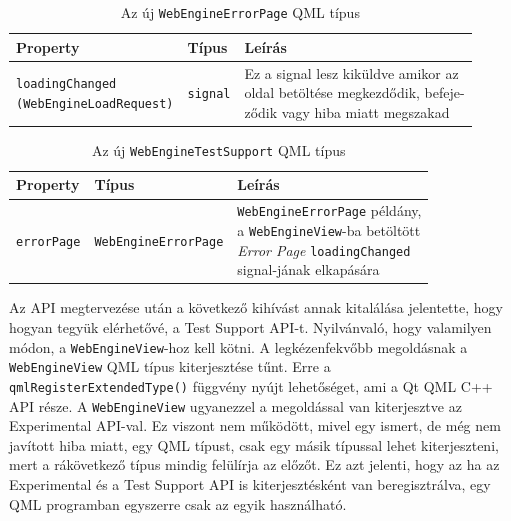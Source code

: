 \documentclass[12pt]{report}
\begin{document}
\begin{table}[h!]
    \centering
    \begin{tabular}{ | l | l | p{185pt} | }
        \hline
        \textbf{Property} & \textbf{Típus} & \textbf{Leírás} \\ \hline

        \makecell[l]{\texttt{loadingChanged} \\ \texttt{(WebEngineLoadRequest)}} &
        \texttt{signal} &
        \makecell[l]{
        Ez a signal lesz kiküldve amikor az \\
        oldal betöltése megkezdődik, befeje-\\
        ződik vagy hiba miatt megszakad}
        \\ \hline
    \end{tabular}
    \caption{
        \label{tab:test-support-webengine-errorpage}
        Az új \texttt{WebEngineErrorPage} QML típus
    }
\end{table}

\begin{table}[ht]
    \centering
    \begin{tabular}{ | l | l | p{195pt} | }
        \hline
        \textbf{Property} & \textbf{Típus} & \textbf{Leírás} \\ \hline

        \texttt{errorPage} & \texttt{WebEngineErrorPage} &
        \makecell[l]{
            \texttt{WebEngineErrorPage} példány, \\
            a \texttt{WebEngineView}-ba betöltött \\
            \textit{Error Page} \texttt{loadingChanged} \\
            signal-jának elkapására}
        \\ \hline
    \end{tabular}
    \caption{
        \label{tab:test-support-webengine-testsupport}
        Az új \texttt{WebEngineTestSupport} QML típus
    }
\end{table}

Az API megtervezése után a következő kihívást annak kitalálása jelentette, hogy
hogyan tegyük elérhetővé, a Test Support API-t. Nyilvánvaló, hogy valamilyen módon,
a \texttt{WebEngineView}-hoz kell kötni. A legkézenfekvőbb megoldásnak a \\
\texttt{WebEngineView} QML típus kiterjesztése tűnt. Erre a \\
\texttt{qmlRegisterExtendedType()} függvény nyújt lehetőséget, ami a Qt QML C++ API része.
A \texttt{WebEngineView} ugyanezzel a megoldással van kiterjesztve az Experimental
API-val. Ez viszont nem működött, mivel egy ismert, de még nem javított hiba miatt,
egy QML típust, csak egy másik típussal lehet kiterjeszteni, mert a rákövetkező típus mindig
felülírja az előzőt. Ez azt jelenti, hogy az ha az Experimental és a Test Support API is
kiterjesztésként van beregisztrálva, egy QML programban egyszerre csak az egyik
használható.
\end{document}
